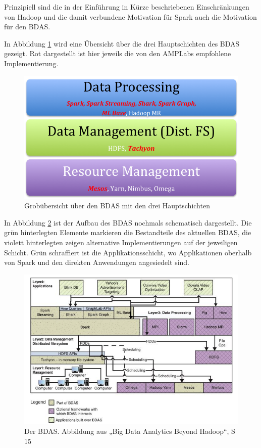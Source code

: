 Prinzipiell sind die in der Einführung in Kürze beschriebenen Einschränkungen von Hadoop und die damit verbundene Motivation für Spark auch die Motivation für den BDAS. 


In Abbildung \ref{fig:BDAS1} wird eine Übersicht über die drei Hauptschichten des BDAS gezeigt. Rot dargestellt ist hier jeweils die von den AMPLabs empfohlene Implementierung.

\begin{figure}[htb!]
\centering
\includegraphics[width=1.0\textwidth]{bilder/2_1_stack.png}
\caption{Grobübersicht über den BDAS mit den drei Hauptschichten}
\label{fig:BDAS1}
\end{figure}
 


In Abbildung \ref{fig:bdas]} ist der Aufbau des BDAS nochmals schematisch dargestellt. Die grün hinterlegten Elemente markieren die Bestandteile des aktuellen BDAS, die violett hinterlegten zeigen alternative Implementierungen auf der jeweiligen Schicht. Grün schraffiert ist die Applikationsschicht, wo Applikationen oberhalb von Spark und den direkten Anwendungen angesiedelt sind. 

\begin{figure}[htb!]
\centering
\includegraphics[width=1.0\textwidth]{bilder/2_2_stack.png}
\caption{Der BDAS. Abbildung aus „Big Data Analytics Beyond Hadoop“, S 15 \protect{}}
\label{fig:bdas]}
\end{figure} 


